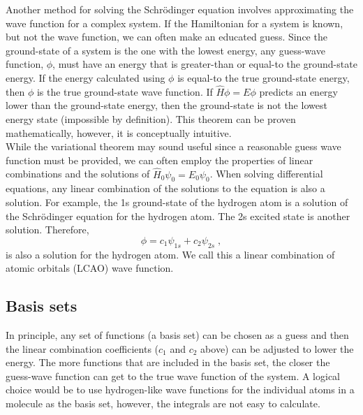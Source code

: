 \documentclass[12pt]{report}
\begin{document}
Another method for solving the Schr\"{o}dinger equation involves approximating
the wave function for a complex system. If the Hamiltonian for a system is
known, but not the wave function, we can often make an educated guess. Since
the ground-state of a system is the one with the lowest energy, any
guess-wave function, $\phi$, must have an energy that is greater-than or
equal-to the ground-state energy. If the energy calculated using $\phi$ is
equal-to the true ground-state energy, then $\phi$ is the true ground-state
wave function. If $\hat H\phi=E\phi$ predicts an energy lower than the
ground-state energy, then the ground-state is not the lowest energy state
(impossible by definition). This theorem can be proven mathematically,
however, it is conceptually intuitive. \\

While the variational theorem may sound useful since a reasonable guess
wave function must be provided, we can often employ the properties of linear
combinations and the solutions of $\hat H_0\psi_0=E_0\psi_0$. When solving
differential equations, any linear combination of the solutions to the
equation is also a solution. For example, the 1s ground-state of the hydrogen
atom is a solution of the Schr\"{o}dinger equation for the hydrogen atom. The
2s excited state is another solution. Therefore,
\begin{equation}
 \phi = c_1\psi_{1s}+c_2\psi_{2s} \; ,
\end{equation}
is also a solution for the hydrogen atom. We call this a linear combination of
atomic orbitals (LCAO) wave function.

\subsection{Basis sets}

In principle, any set of functions (a basis set) can be chosen as a guess and
then the linear combination coefficients ($c_1$ and $c_2$ above) can be
adjusted to lower the energy. The more functions that are included in the
basis set, the closer the guess-wave function can get to the true wave
function of the system. A logical choice would be to use hydrogen-like wave
functions for the individual atoms in a molecule as the basis set, however,
the integrals are not easy to calculate. \\
\end{document}
